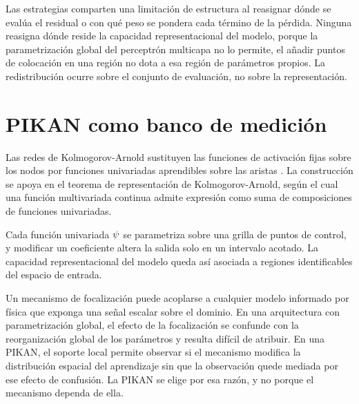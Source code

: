 Las estrategias comparten una limitación de estructura al reasignar dónde se evalúa el residual o con qué peso se pondera cada término de la pérdida. Ninguna reasigna dónde reside la capacidad representacional del modelo, porque la parametrización global del perceptrón multicapa no lo permite, el añadir puntos de colocación en una región no dota a esa región de parámetros propios. La redistribución ocurre sobre el conjunto de evaluación, no sobre la representación.

\section{PIKAN como banco de medición}

Las redes de Kolmogorov-Arnold sustituyen las funciones de activación fijas sobre los nodos por funciones univariadas aprendibles sobre las aristas \cite{liu2024kan}. La construcción se apoya en el teorema de representación de Kolmogorov-Arnold, según el cual una función multivariada continua admite expresión como suma de composiciones de funciones univariadas.


Cada función univariada $\psi$ se parametriza sobre una grilla de puntos de control, y modificar un coeficiente altera la salida solo en un intervalo acotado. La capacidad representacional del modelo queda así asociada a regiones identificables del espacio de entrada.

Un mecanismo de focalización puede acoplarse a cualquier modelo informado por física que exponga una señal escalar sobre el dominio. En una arquitectura con parametrización global, el efecto de la focalización se confunde con la reorganización global de los parámetros y resulta difícil de atribuir. En una PIKAN, el soporte local permite observar si el mecanismo modifica la distribución espacial del aprendizaje sin que la observación quede mediada por ese efecto de confusión. La PIKAN se elige por esa razón, y no porque el mecanismo dependa de ella.



